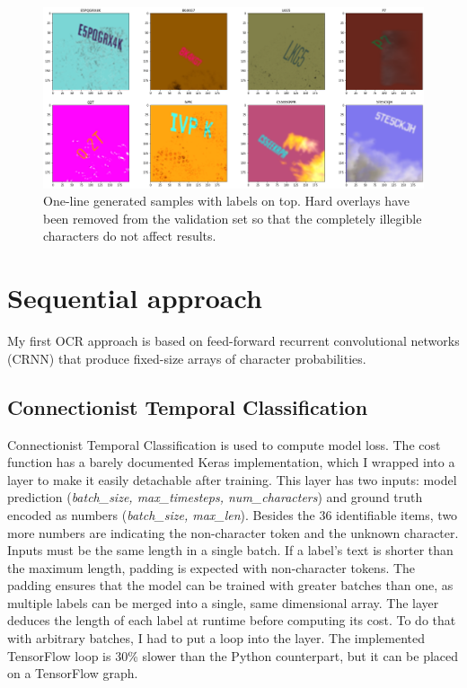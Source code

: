 \begin{figure}[htb]
 \centerline{\includegraphics[width=1.0\columnwidth]{.//Figure/OCR/generated.png}}
 \caption{One-line generated samples with labels on top. Hard overlays have been removed from the validation set so that the completely illegible characters do not affect results.}
 \label{fig:generated}
\end{figure}

\section{Sequential approach}

My first OCR approach is based on feed-forward recurrent convolutional networks (CRNN) that produce fixed-size arrays of character probabilities.

\subsection{Connectionist Temporal Classification}

Connectionist Temporal Classification\cite{CTC} is used to compute model loss. The cost function has a barely documented Keras implementation, which I wrapped into a layer to make it easily detachable after training. This layer has two inputs: model prediction (\textit{batch\_size, max\_timesteps, num\_characters}) and ground truth encoded as numbers (\textit{batch\_size, max\_len}). Besides the 36 identifiable items, two more numbers are indicating the non-character token and the unknown character. Inputs must be the same length in a single batch. If a label's text is shorter than the maximum length, padding is expected with non-character tokens. The padding ensures that the model can be trained with greater batches than one, as multiple labels can be merged into a single, same dimensional array. The layer deduces the length of each label at runtime before computing its cost. To do that with arbitrary batches, I had to put a loop into the layer. The implemented TensorFlow loop is 30\% slower than the Python counterpart, but it can be placed on a TensorFlow graph.

